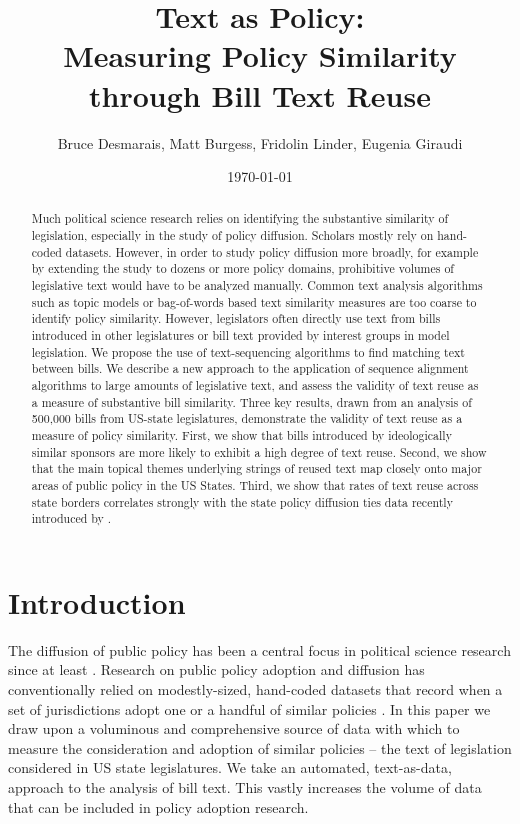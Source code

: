 \documentclass[12pt]{article} %
\begin{document}
 

\title{Text as Policy: \\ Measuring Policy Similarity through Bill Text Reuse}
\date{\today}
\author{Bruce Desmarais, Matt Burgess, Fridolin Linder, Eugenia Giraudi}

\maketitle

\begin{abstract} 
    Much political science research relies on identifying the substantive similarity of legislation, especially in the study of policy diffusion. Scholars mostly rely on hand-coded datasets. However, in order to study policy diffusion more broadly, for example by extending the study to dozens or more policy domains, prohibitive volumes of legislative text would have to be analyzed manually. Common text analysis algorithms such as topic models or bag-of-words based text similarity measures are too coarse to identify policy similarity. However, legislators often directly use text from bills introduced in other legislatures or bill text provided by interest groups in model legislation. We propose the use of text-sequencing algorithms to find matching text between bills. We describe a new approach to the application of sequence alignment algorithms to large amounts of legislative text, and assess the validity of text reuse as a measure of substantive bill similarity. Three key results, drawn from an analysis of 500,000 bills from US-state legislatures, demonstrate the validity of text reuse as a measure of policy similarity. First, we show that bills introduced by ideologically similar sponsors are more likely to exhibit a high degree of text reuse. Second, we show that the main topical themes underlying strings of reused text map closely onto major areas of public policy in the US States. Third, we show that rates of text reuse across state borders correlates strongly with the state policy diffusion ties data recently introduced by \citet{desmarais2015}.
\end{abstract}

\section{Introduction}

The diffusion of public policy has been a central focus in political science research since at least \citet{walker1969}. Research on public policy adoption and diffusion has conventionally relied on modestly-sized, hand-coded datasets that record when a set of jurisdictions adopt one or a handful of similar policies \citep{boehmke2012}. In this paper we draw upon a voluminous and comprehensive source of data with which to measure the consideration and adoption of similar policies -- the text of legislation considered in US state legislatures. We take an automated, text-as-data, approach to the analysis of bill text. This vastly increases the volume of data that can be included in policy adoption research. 
\end{document}
